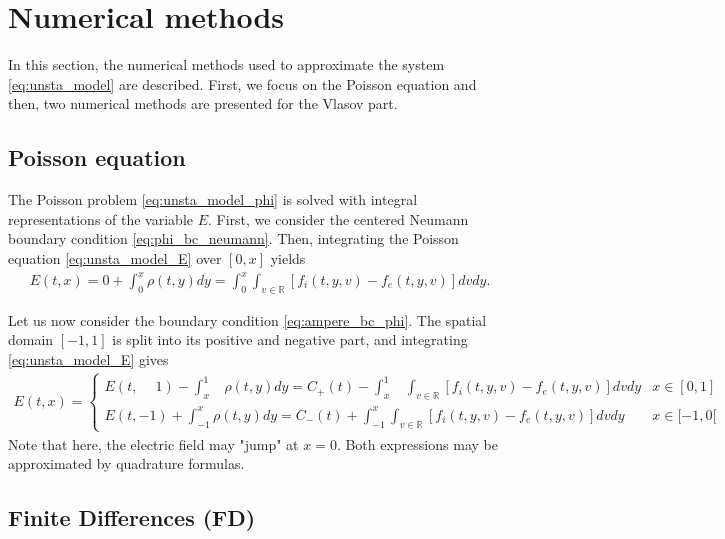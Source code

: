 \documentclass{article}
\numberwithin{equation}{section}
\newcommand{\R}{\mathbb{R}}
\begin{document}

\section{Numerical methods}\label{sec:nummethods}
In this section, the numerical methods used to approximate the system \cref{eq:unsta_model} are described. 
First, we focus on the Poisson equation and  then, two numerical methods are presented for the Vlasov part. 

\subsection{Poisson equation}
 The Poisson problem \cref{eq:unsta_model_phi} is solved with integral representations of the variable $E$.
First, we consider the centered Neumann boundary condition \cref{eq:phi_bc_neumann}. Then, integrating the Poisson equation \cref{eq:unsta_model_E} over $[0,x]$ yields
\begin{align}\label{eq:integral_representation_E_sym}
	E(t,x) = 0 + \int_0^x \rho(t,y) dy = \int_0^x \int_{v\in\R} [f_i(t,y,v) - f_e(t,y,v)] dv dy.
\end{align}

Let us now consider the boundary condition \cref{eq:ampere_bc_phi}. The spatial domain $[-1,1]$ is split into its positive and negative part, and integrating \cref{eq:unsta_model_E} gives
\begin{align}\label{eq:integral_representation_E_naturalbc}
	E(t,x) = 
	\begin{cases}
	E(t,\phantom{-}1) - \int_{x\phantom{-}}^{1} \rho(t,y) dy =  C_{+}(t) - \int_{x\phantom{-}}^1 \int_{v\in\R} [f_i(t,y,v) - f_e(t,y,v)] dv dy & x \in [0,1] \\
	E(t,-1) + \int_{-1}^x \rho(t,y) dy = C_{-}(t) + \int_{-1}^x \int_{v\in\R} [f_i(t,y,v) - f_e(t,y,v)] dv dy & x \in [-1,0[ 
	\end{cases}
\end{align}
Note that here, the electric field may "jump" at $x=0$. Both expressions may be approximated by quadrature formulas. 

\subsection{Finite Differences (FD)}
\end{document}
